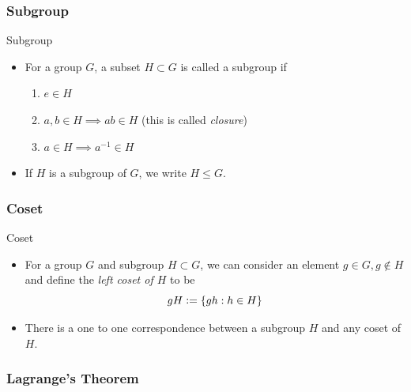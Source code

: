 \documentclass{article}
\newcommand{\defeq}{\vcentcolon=}
\begin{document}
\vskip 1cm
\subsubsection{Subgroup}

\vskip 0.5cm
\begin{mathdefinitionbox}{Subgroup}
  \vskip 0.5cm
  \begin{itemize}
    \item   For a group $G$, a subset $H \subset G$ is called a subgroup if 
    \begin{enumerate}[label=(\alph*)]
      \item $e \in H$
      \item $a, b \in H \implies ab \in H$ (this is called \emph{closure})
      \item $a \in H \implies a^{-1} \in H$ 
    \end{enumerate}

    \item If $H$ is a subgroup of $G$, we write $H \leq G$.
  \end{itemize}
\end{mathdefinitionbox}



\vskip 1cm
\subsubsection{Coset}

\vskip 0.5cm
\begin{mathdefinitionbox}{Coset}
\vskip 0.5cm
  \begin{itemize}
    \item For a group $G$ and subgroup $H \subset G$, we can consider an element $g \in G, g \not\in H$ and define the \emph{left coset of $H$} to be
    \[ gH \defeq \{ gh : h \in H \} \]

    \item There is a one to one correspondence between a subgroup $H$ and any coset of $H$.
  \end{itemize}
\end{mathdefinitionbox}

\vskip 1cm
\subsubsection{Lagrange's Theorem}
\end{document}
